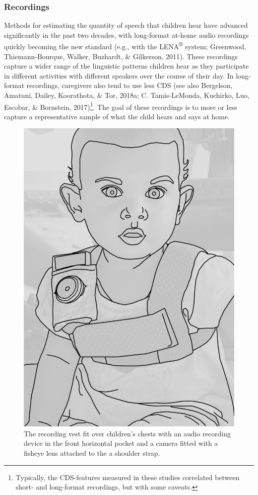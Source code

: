 \documentclass[floatsintext,man]{apa6}
\theoremstyle{definition}
\theoremstyle{definition}
\theoremstyle{definition}
\theoremstyle{remark}
\begin{document}
\subsubsection{Recordings}\label{methods-corpus-recs}

Methods for estimating the quantity of speech that children hear have
advanced significantly in the past two decades, with long-format at-home
audio recordings quickly becoming the new standard (e.g., with the
LENA\textsuperscript{®} system; Greenwood, Thiemann-Bourque, Walker,
Buzhardt, \& Gilkerson, 2011). These recordings capture a wider range of
the linguistic patterns children hear as they participate in different
activities with different speakers over the course of their day. In
long-format recordings, caregivers also tend to use less CDS (see also
Bergelson, Amatuni, Dailey, Koorathota, \& Tor, 2018a; C. Tamis-LeMonda,
Kuchirko, Luo, Escobar, \& Bornstein, 2017)\footnote{Typically, the
  CDS-features measured in these studies correlated between short- and
  long-format recordings, but with some caveats.}. The goal of these
recordings is to more or less capture a representative sample of what
the child hears and says at home.

\begin{figure}

{\centering \includegraphics[width=0.5\linewidth]{Tseltal-CLE_files/TseltalCLE-RecordingVest} 

}

\caption{The recording vest fit over children's chests with an audio recording device in the front horizontal pocket and a camera fitted with a fisheye lens attached to the a shoulder strap.}\label{fig:fig1}
\end{figure}
\end{document}
